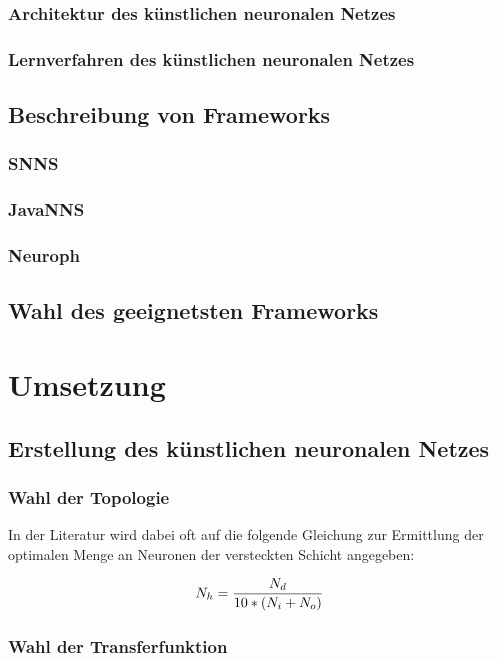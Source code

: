 \documentclass[a4paper,DIV11,bibliography=totoc,headings=normal,ngerman,headsepline]{scrreprt}
\newcommand*{\formelentry}[1]{\addcontentsline{for}{formel}{\protect\numberline{Formel~\theequation} #1}}
\begin{document}
\subsection{Architektur des künstlichen neuronalen Netzes} %
\subsection{Lernverfahren des künstlichen neuronalen Netzes} %
\section{Beschreibung von Frameworks} %
\subsection{SNNS} %
\subsection{JavaNNS}  %
\subsection{Neuroph} %
\section{Wahl des geeignetsten Frameworks} %
\chapter{Umsetzung} %
\section{Erstellung des künstlichen neuronalen Netzes} %

\subsection{Wahl der Topologie} %
In der Literatur wird dabei oft auf die folgende Gleichung zur Ermittlung der optimalen  Menge an Neuronen der versteckten Schicht angegeben:

\begin{equation}\formelentry{Optimale Anzahl Neuronen in der versteckten Schicht}
  N_h = \frac{N_d}{10*(N_i+N_o)}
\end{equation}

\subsection{Wahl der Transferfunktion} %
\end{document}
